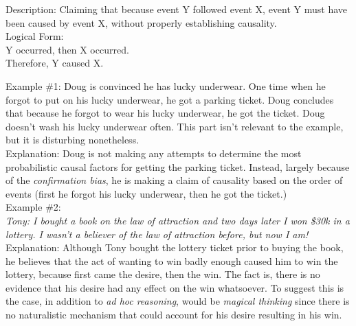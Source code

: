\documentclass[a4paper,12pt,single,pdftex]{scrartcl}
\begin{document}
      Description: Claiming that because event Y followed event X, event Y must have been caused by event X, without properly establishing causality.
    \\

    
      Logical Form:
    \\

    
      Y occurred, then X occurred.
    \\

    
      Therefore, Y caused X.
    \\

    
       \newline

      

      
        Example \#1: Doug is convinced he has lucky underwear. One time when he forgot to put on his lucky underwear, he got a parking ticket. Doug concludes that because he forgot to wear his lucky underwear, he got the ticket. Doug doesn't wash his lucky underwear often. This part isn't relevant to the example, but it is disturbing nonetheless.
      \\

      
        Explanation: Doug is not making any attempts to determine the most probabilistic causal factors for getting the parking ticket. Instead, largely because of the {\em confirmation bias}, he is making a claim of causality based on the order of events (first he forgot his lucky underwear, then he got the ticket.)
      \\

      
        Example \#2: 
      \\

      
        {\em Tony: I bought a book on the law of attraction and two days later I won \$30k in a lottery. I wasn’t a believer of the law of attraction before, but now I am!}
      \\

      
        Explanation: Although Tony bought the lottery ticket prior to buying the book, he believes that the act of wanting to win badly enough caused him to win the lottery, because first came the desire, then the win. The fact is, there is no evidence that his desire had any effect on the win whatsoever. To suggest this is the case, in addition to {\em ad hoc reasoning}, would be {\em magical thinking}  since there is no naturalistic mechanism that could account for his desire resulting in his win.
      \\
\end{document}
